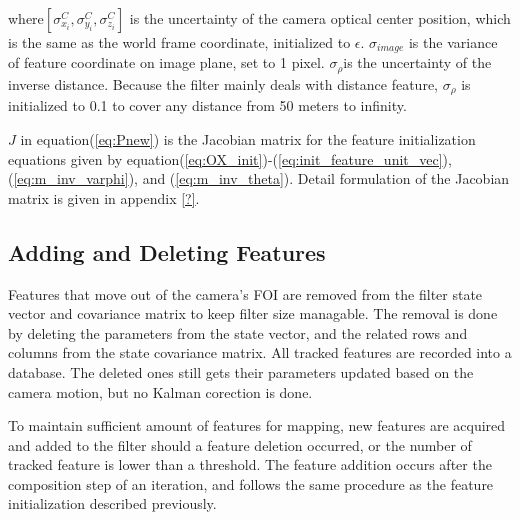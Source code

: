 \noindent where$[\sigma_{x_{i}}^{C}, \sigma_{y_{i}}^{C}, \sigma
_{z_{i}}^{C}]$ is the uncertainty of the camera optical center
position, which is the same as the world frame coordinate, initialized
to $\epsilon$. $\sigma_{image}$ is the variance of feature coordinate
on image plane, set to 1 pixel. $\sigma _{\rho } $is the uncertainty
of the inverse distance. Because the filter mainly deals with distance
feature, $ \sigma _{\rho }$ is initialized to 0.1 to cover any
distance from 50 meters to infinity.

$J$ in equation(\ref{eq:Pnew}) is the Jacobian matrix for the feature
initialization equations given by
equation(\ref{eq:OX_init})-(\ref{eq:init_feature_unit_vec}),
(\ref{eq:m_inv_varphi}), and (\ref{eq:m_inv_theta}). Detail
formulation of the Jacobian matrix is given in appendix \ref{?}.



\subsection{Adding and Deleting Features}
Features that move out of the camera's FOI are removed from the filter
state vector and covariance matrix to keep filter size managable. 
The removal is done by deleting the parameters from the state 
vector, and the related rows and columns from the state covariance 
matrix. All tracked features are recorded into a database. The deleted
ones still gets their parameters updated based on the camera motion,
but no Kalman corection is done.

To maintain sufficient amount of features for mapping, new features 
are acquired and added to the filter should a feature deletion 
occurred, or the number of tracked feature is lower than a threshold. The 
feature addition occurs after the composition step of an 
iteration, and follows the same procedure as the feature
initialization described previously. 



